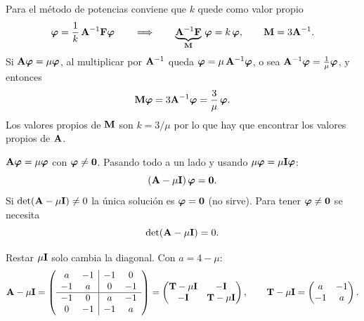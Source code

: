 Para el método de potencias conviene que $k$ quede como valor propio
\[
\bm{\varphi} = \frac1k\,\mathbf{A}^{-1}\mathbf{F}\bm{\varphi}
\qquad\Longrightarrow\qquad
\underbrace{\mathbf{A}^{-1}\mathbf{F}}_{\mathbf{M}}\,\bm{\varphi} = k\,\bm{\varphi},
\qquad \mathbf{M} = 3\mathbf{A}^{-1} .
\]
Si $\mathbf{A}\bm{\varphi} = \mu\bm{\varphi}$, al multiplicar por $\mathbf{A}^{-1}$ queda $\bm{\varphi} = \mu\,\mathbf{A}^{-1}\bm{\varphi}$, o sea
$\mathbf{A}^{-1}\bm{\varphi} = \frac1\mu\bm{\varphi}$, y entonces
\[
\mathbf{M}\bm{\varphi} = 3\mathbf{A}^{-1}\bm{\varphi} = \frac3\mu\,\bm{\varphi} .
\]
Los valores propios de $\mathbf{M}$ son $k = 3/\mu$ por lo que hay que encontrar los valores propios de $\mathbf{A}$.

$\mathbf{A}\bm{\varphi} = \mu\bm{\varphi}$ con $\bm{\varphi} \neq \bm{0}$. Pasando todo a un lado y usando
$\mu\bm{\varphi} = \mu\mathbf{I}\bm{\varphi}$:
\[
(\mathbf{A} - \mu\mathbf{I})\,\bm{\varphi} = \bm{0} .
\]
Si $\det(\mathbf{A} - \mu\mathbf{I}) \neq 0$ la única solución es $\bm{\varphi} = \bm{0}$ (no sirve). Para tener
$\bm{\varphi} \neq \bm{0}$ se necesita
\[
\det(\mathbf{A} - \mu\mathbf{I}) = 0 .
\]

Restar $\mu\mathbf{I}$ solo cambia la diagonal. Con $a = 4 - \mu$:
\[
\mathbf{A} - \mu\mathbf{I} =
\left(\begin{array}{cc|cc}
	a & -1 & -1 &  0\\
	-1 &  a &  0 & -1\\ \hline
	-1 &  0 &  a & -1\\
	0 & -1 & -1 &  a
\end{array}\right)
= \begin{pmatrix} \mathbf{T} - \mu\mathbf{I} & -\mathbf{I}\\ -\mathbf{I} & \mathbf{T} - \mu\mathbf{I} \end{pmatrix},
\qquad
\mathbf{T} - \mu\mathbf{I} = \begin{pmatrix} a & -1\\ -1 & a \end{pmatrix}.
\]


